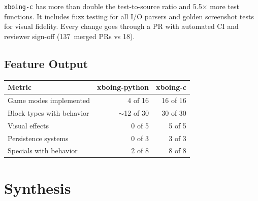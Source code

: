 \documentclass[a4paper,10pt]{article}
\newcommand{\repo}[1]{\texttt{#1}}
\begin{document}
\repo{xboing-c} has more than double the test-to-source ratio and
5.5$\times$ more test functions.  It includes fuzz testing for all
I/O parsers and golden screenshot tests for visual fidelity.  Every
change goes through a PR with automated CI and reviewer sign-off
(137~merged PRs vs 18).

\subsection{Feature Output}

\begin{center}
\begin{tabular}{@{}lrr@{}}
\toprule
\textbf{Metric} & \textbf{xboing-python} & \textbf{xboing-c} \\
\midrule
Game modes implemented & 4 of 16 & 16 of 16 \\
Block types with behavior & $\sim$12 of 30 & 30 of 30 \\
Visual effects & 0 of 5 & 5 of 5 \\
Persistence systems & 0 of 3 & 3 of 3 \\
Specials with behavior & 2 of 8 & 8 of 8 \\
\bottomrule
\end{tabular}
\end{center}

\section{Synthesis}
\end{document}
